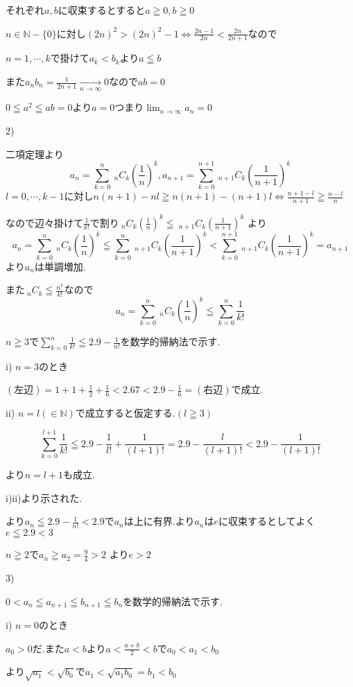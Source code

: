 \documentclass{jsarticle}
\begin{document}
それぞれ$a,b$に収束するとすると$a\geqq0,b\geqq 0$

$n\in\mathbb{N}-\{0\}$に対し$(2n)^2>(2n)^2-1\Leftrightarrow \frac{2n-1}{2n}<\frac{2n}{2n+1}$なので

$n=1,\cdots ,k$で掛けて$a_k<b_k$より$a\leqq b$

また$a_nb_n = \frac{1}{2n+1}\xrightarrow[n\to\infty]{}0$なので$ab=0$

$0\leqq a^2\leqq ab = 0$より$a=0$つまり$\displaystyle \lim_{n\to\infty}a_n=0$

2)

二項定理より
\[a_n=\sum_{k=0}^n \ _nC_k (\frac{1}{n})^k,a_{n+1}=\sum_{k=0}^{n+1} \ _{n+1}C_k (\frac{1}{n+1})^k\]
$l=0,\cdots ,k-1$に対し$n(n+1)-nl\geqq n(n+1)-(n+1)l\Leftrightarrow \frac{n+1-l}{n+1}\geqq \frac{n-l}{n}$

なので辺々掛けて$\frac{1}{k!}$で割り$ \ _nC_k (\frac{1}{n})^k \leqq \ _{n+1}C_k (\frac{1}{n+1})^k$
より
\[a_n=\sum_{k=0}^n \ _nC_k (\frac{1}{n})^k\leqq \sum_{k=0}^{n} \ _{n+1}C_k (\frac{1}{n+1})^k < \sum_{k=0}^{n+1} \ _{n+1}C_k (\frac{1}{n+1})^k=a_{n+1}\]
より$a_n$は単調増加.

また$ \ _nC_k\leqq \frac{n^k}{k!}$なので
\[a_n=\sum_{k=0}^n \ _nC_k (\frac{1}{n})^k\leqq \sum_{k=0}^{n} \frac{1}{k!}\]

$n\geqq3$で$\displaystyle \sum_{k=0}^n\frac{1}{k!} \leqq 2.9 - \frac{1}{n!}$を数学的帰納法で示す.

i) $n=3$のとき

$(左辺)=1+1+\frac{1}{2}+\frac{1}{6}<2.67 < 2.9-\frac{1}{6}=(右辺)$で成立.

ii) $n=l(\in \mathbb{N})$で成立すると仮定する.$(l\geqq 3)$

\[\sum_{k=0}^{l+1}\frac{1}{k!} \leqq 2.9-\frac{1}{l!}+\frac{1}{(l+1)!}=2.9-\frac{l}{(l+1)!}<2.9-\frac{1}{(l+1)!}\]

より$n=l+1$も成立.

i)ii)より示された.

より$a_n\leqq 2.9 -  \frac{1}{n!} < 2.9$で$a_n$は上に有界.より$a_n$は$e$に収束するとしてよく$e \leqq 2.9 < 3$

$n\geqq 2$で$a_n\geqq a_2 = \frac{9}{4}>2$
より$e>2$            

3)

$0 < a_n\leqq a_{n+1} \leqq b_{n+1} \leqq b_n$を数学的帰納法で示す.

i) $n=0$のとき

$a_0>0$だ.また$a<b$より$a<\frac{a+b}{2}<b$で$a_0 < a_1 < b_0$

より$\sqrt{a_1} < \sqrt{b_0}$で$a_1<\sqrt{a_1b_0}=b_1<b_0$
\end{document}

